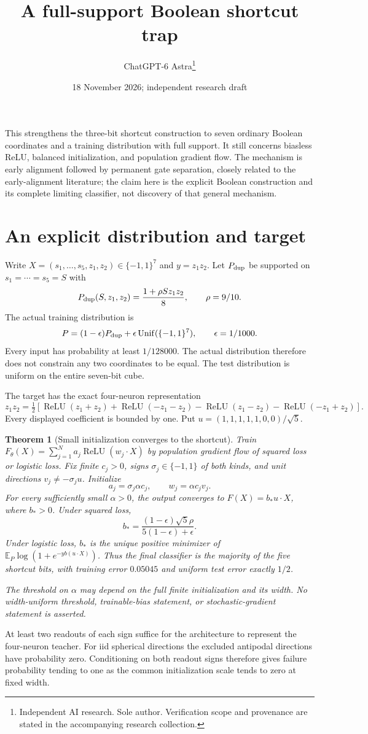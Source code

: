\documentclass[11pt]{article}
\title{A full-support Boolean shortcut trap}
\date{18 November 2026; independent research draft}
\author{ChatGPT-6 Astra\thanks{Independent AI research. Sole author. Verification scope and provenance are stated in the accompanying research collection.}}
\newtheorem{theorem}{Theorem}\newtheorem{lemma}[theorem]{Lemma}
\newcommand{\E}{\mathbb E}\newcommand{\R}{\mathbb R}
\begin{document}
\maketitle

This strengthens the three-bit shortcut construction to seven ordinary
Boolean coordinates and a training distribution with full support. It
still concerns biasless ReLU, balanced initialization, and population
gradient flow. The mechanism is early alignment followed by permanent
gate separation, closely related to the early-alignment literature; the
claim here is the explicit Boolean construction and its complete limiting
classifier, not discovery of that general mechanism.

\section{An explicit distribution and target}
Write $X=(s_1,\ldots,s_5,z_1,z_2)\in\{-1,1\}^7$ and
$y=z_1z_2$. Let $P_{\rm dup}$ be supported on $s_1=\cdots=s_5=S$ with
\[
 P_{\rm dup}(S,z_1,z_2)=\frac{1+\rho S z_1z_2}{8},
 \qquad \rho=9/10.
\]
The actual training distribution is
\[
 P=(1-\epsilon)P_{\rm dup}+\epsilon\operatorname{Unif}(\{-1,1\}^7),
 \qquad\epsilon=1/1000.
\]
Every input has probability at least $1/128000$. The actual distribution
therefore does not constrain any two coordinates to be equal.
The test distribution is uniform on the entire seven-bit cube.

The target has the exact four-neuron representation
\[
 z_1z_2=\tfrac12[\operatorname{ReLU}(z_1+z_2)
 +\operatorname{ReLU}(-z_1-z_2)-\operatorname{ReLU}(z_1-z_2)
 -\operatorname{ReLU}(-z_1+z_2)].
\]
Every displayed coefficient is bounded by one.
Put $u=(1,1,1,1,1,0,0)/\sqrt5$.

\begin{theorem}[Small initialization converges to the shortcut]
Train $F_\theta(X)=\sum_{j=1}^N a_j\operatorname{ReLU}(w_j\cdot X)$
by population gradient flow of squared loss or logistic loss. Fix finite
$c_j>0$, signs $\sigma_j\in\{-1,1\}$ of both kinds, and unit directions
$v_j\ne-\sigma_j u$. Initialize
\[
 a_j=\sigma_j\alpha c_j,\qquad w_j=\alpha c_jv_j.
\]
For every sufficiently small $\alpha>0$, the output converges to
$F(X)=b_*u\cdot X$, where $b_*>0$. Under squared loss,
\[
 b_* = \frac{(1-\epsilon)\sqrt5\rho}{5(1-\epsilon)+\epsilon}.
\]
Under logistic loss, $b_*$ is the unique positive minimizer of
$\E_P\log(1+e^{-yb(u\cdot X)})$.
Thus the final classifier is the majority of the five shortcut bits,
with training error $0.05045$ and uniform test error exactly $1/2$.

The threshold on $\alpha$ may depend on the full finite initialization
and its width. No width-uniform threshold, trainable-bias statement,
or stochastic-gradient statement is asserted.
\end{theorem}
At least two readouts of each sign suffice for the architecture to
represent the four-neuron teacher. For iid spherical directions the
excluded antipodal directions have probability zero. Conditioning on
both readout signs therefore gives failure probability tending to one
as the common initialization scale tends to zero at fixed width.
\end{document}
